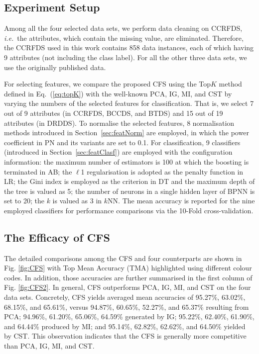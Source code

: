 \documentclass{article}
\newcommand{\zzie}{\emph{i.e.}~}
\newcommand*{\1}{\textcolor{magenta}}
\begin{document}
	\subsection{Experiment Setup}


	Among all the four selected data sets, we perform data cleaning on CCRFDS, \zzie the attributes, which contain the missing value, are eliminated. Therefore, the CCRFDS used in this work contains 858 data instances, each of which having 9 attributes (not including the class label). For all the other three data sets, we use the originally published data.
	
	For selecting features, we compare the proposed CFS using the Top$K$ method defined in Eq.~(\ref{eq:topK}) with the well-known PCA, IG, MI, and CST by varying the numbers of the selected features for classification. That is, we select 7 out of 9 attributes (in CCRFDS, BCCDS, and BTDS) and 15 out of 19 attributes (in DRDDS). To normalise the selected features, 8 normalisation methods introduced in Section~\ref{sec:featNorm} are employed, in which the power coefficient in PN and its variants are set to 0.1. For classification, 9 classifiers (introduced in Section~\ref{sec:featClasf}) are employed with the configuration information: the maximum number of estimators is 100 at which the boosting is terminated in AB; the $\ell$1 regularisation is adopted as the penalty function in LR; the Gini index is employed as the criterion in DT and the maximum depth of the tree is valued as 5; the number of neurons in a single hidden layer of BPNN is set to 20; the $k$ is valued as 3 in $k$NN. The mean accuracy is reported for the nine employed classifiers for performance comparisons via the 10-Fold cross-validation.
	
	\subsection{The Efficacy of CFS}
The detailed comparisons among the CFS and four counterparts are shown in Fig. \ref{fig:CFS} with Top Mean Accuracy (TMA) highlighted using different colour codes. In addition, those accuracies are further summarised in the first column of Fig. \ref{fig:CFS2}. In general, CFS outperforms PCA, IG, MI, and CST on the four data sets. Concretely, CFS yields averaged mean accuracies of 95.27\%, 63.02\%, 68.15\%, and 65.61\%, versus 94.87\%, 60.65\%, 52.27\%, and 65.37\% resulting from PCA; 94.96\%, 61.20\%, 65.06\%, 64.59\% generated by IG; 95.22\%, 62.40\%, 61.90\%, and 64.44\% produced by MI; and 95.14\%, 62.82\%, 62.62\%, and 64.50\% yielded by CST. This observation indicates that the CFS is generally more competitive than PCA, IG, MI, and CST.
	
\end{document}
